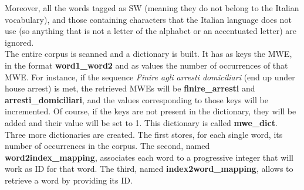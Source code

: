 \documentclass[twoside,twocolumn]{article}
\begin{document}
	Moreover, all the words tagged as SW (meaning they do not belong to the Italian vocabulary), and those containing  characters that the Italian language does not use (so anything that is not a letter of the alphabet or an accentuated letter) are ignored. \\
	The entire corpus is scanned and a dictionary is built. It has as keys the MWE, in the format \textbf{word1\_word2} and as values the number of occurrences of that MWE. For instance, if the sequence \textit{Finire agli arresti domiciliari} (end up under house arrest) is met, the retrieved MWEs will be \textbf{finire\_arresti} and \textbf{arresti\_domiciliari}, and the values corresponding to those keys will be incremented. Of course, if the keys are not present in the dictionary, they will be added and their value will be set to 1. This dictionary is called \textbf{mwe\_dict}.\\
	Three more dictionaries are created. The first stores, for each single word, its number of occurrences in the corpus. The second, named \textbf{word2index\_mapping}, associates each word to a progressive integer that will work as ID for that word. The third, named \textbf{index2word\_mapping}, allows to retrieve a word by providing its ID. 
\end{document}
